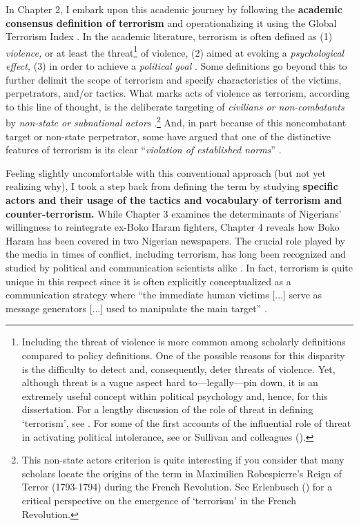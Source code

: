 In Chapter 2, I embark upon this academic journey by following the \textbf{academic consensus definition of terrorism} \citep{Schmid2011} and operationalizing it using the Global Terrorism Index \citep{TheInstituteforEconomicsandPeace2016}. In the academic literature, terrorism is often defined as (1) \textit{violence,} or at least the threat\footnote{Including the threat of violence is more common among scholarly definitions compared to policy definitions. One of the possible reasons for this disparity is the difficulty to detect and, consequently, deter threats of violence. Yet, although threat is a vague aspect hard to---legally---pin down, it is an extremely useful concept within political psychology and, hence, for this dissertation. For a lengthy discussion of the role of threat in defining `terrorism', see \cite{Brown2020}. For some of the first accounts of the influential role of threat in activating political intolerance, see \cite{Stouffer1955} or Sullivan and colleagues (\citeyear{Sullivan1981, Sullivan1982}).} of violence, (2) aimed at evoking a \textit{psychological effect,} (3) in order to achieve a \textit{political goal }\citep[e.g.,][]{Richards2014}. Some definitions go beyond this to further delimit the scope of terrorism and specify characteristics of the victims, perpetrators, and/or tactics. What marks acts of violence as terrorism, according to this line of thought, is the deliberate targeting of \textit{civilians or non-combatants }\citep[e.g.,][]{Schmid2011} by \textit{non-state or subnational actors }\citep[e.g.,][this criterion is also used in the Global Terrorism Index]{LaFree2015}.\footnote{This non-state actors criterion is quite interesting if you consider that many scholars locate the origins of the term in Maximilien Robespierre’s Reign of Terror (1793-1794) during the French Revolution. See Erlenbusch (\citeyear{Erlenbusch2015}) for a critical perspective on the emergence of `terrorism' in the French Revolution.} And, in part because of this noncombatant target or non-state perpetrator, some have argued that one of the distinctive features of terrorism is its clear ``\textit{violation of established norms}''  \citep[][p. 3]{Laqueur1987}. 


Feeling slightly uncomfortable with this conventional approach (but not yet realizing why), I took a step back from defining the term by studying\textbf{ specific actors and their usage of the tactics and vocabulary of terrorism and counter-terrorism.} While Chapter 3 examines the determinants of Nigerians' willingness to reintegrate ex-Boko Haram fighters, Chapter 4 reveals how Boko Haram has been covered in two Nigerian newspapers. The crucial role played by the media in times of conflict, including terrorism, has long been recognized and studied by political and communication scientists alike \citep[e.g.,][]{Wolfsfeld2004, Tenenboim-Weinblatt2016}. In fact, terrorism is quite unique in this respect since it is often explicitly conceptualized as a communication strategy where ``the immediate human victims [...] serve as message generators [...] used to manipulate the main target'' \citep[][p. 28]{Schmid1988}.


